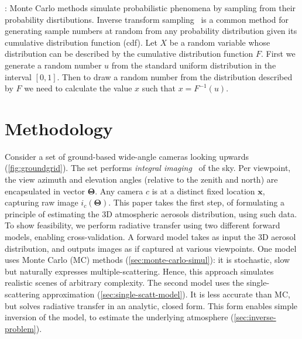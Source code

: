 \documentclass[10pt,letterpaper]{article}
\begin{document}
: Monte Carlo methods
simulate probabilistic phenomena by sampling from their probability
disrtibutions.  Inverse transform sampling~\cite{devroye1986sample} is
a common method for generating sample numbers at random from any
probability distribution given its cumulative distribution function
(cdf).  Let $X$ be a random variable whose distribution can be
described by the cumulative distribution function $F$.  First we
generate a random number $u$ from the standard uniform distribution in
the interval $[0,1]$.  Then to draw a random number from the
distribution described by $F$ we need to calculate the value $x$ such
that $x = F^{-1}(u)$.



\section{Methodology}
\label{sec:methodology}

Consider a set of ground-based wide-angle cameras
looking upwards (\cref{fig:groundgrid}). The set performs {\em
  integral imaging}~\cite{Hong2004} of the sky. Per viewpoint, the
view azimuth and elevation angles (relative to the zenith and north)
are encapsulated in vector ${\bm{\Theta}}$. Any camera $c$ is at a
distinct fixed location ${\bm x}$, capturing raw image
$i_c({\bm{\Theta}})$. This paper takes the first step, of formulating
a principle of estimating the 3D atmospheric aerosols distribution,
using such data. To show feasibility, we perform radiative transfer
using two different forward models, enabling cross-validation.  A
forward model takes as input the 3D aerosol distribution, and outputs
images as if captured at various viewpoints. One model uses Monte
Carlo (MC) methods (\cref{sec:monte-carlo-simul}): it is stochastic,
slow but naturally expresses multiple-scattering. Hence, this approach
simulates realistic scenes of arbitrary complexity.  The second model
uses the single-scattering approximation
(\cref{sec:single-scatt-model}). It is less accurate than MC, but
solves radiative transfer in an analytic, closed form. This form
enables simple inversion of the model, to estimate the underlying
atmosphere (\cref{sec:inverse-problem}).

\end{document}
